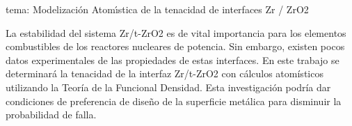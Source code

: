 tema: Modelización Atomı́stica de la tenacidad de interfaces Zr / ZrO2


La estabilidad del sistema Zr/t-ZrO2 es de vital importancia para los
elementos combustibles de los reactores nucleares de potencia. 
Sin embargo, existen pocos datos experimentales de las propiedades de estas interfaces.
En este trabajo se determinará la tenacidad de la interfaz Zr/t-ZrO2
con cálculos atomísticos utilizando la Teoría de la Funcional Densidad.
Esta investigación podría dar condiciones de preferencia de 
diseño de la superficie metálica para disminuir la probabilidad de falla.
